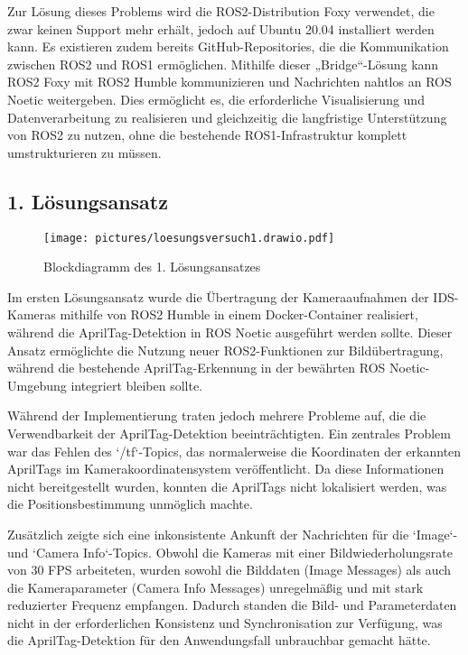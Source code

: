 \documentclass[ngerman]{article}    %
\theoremstyle{definition}
\begin{document}
Zur Lösung dieses Problems wird die ROS2-Distribution Foxy verwendet, die zwar keinen Support mehr erhält, jedoch auf Ubuntu 20.04 installiert werden kann. Es existieren zudem bereits GitHub-Repositories, die die Kommunikation zwischen ROS2 und ROS1 ermöglichen. Mithilfe dieser „Bridge“-Lösung kann ROS2 Foxy mit ROS2 Humble kommunizieren und Nachrichten nahtlos an ROS Noetic weitergeben. Dies ermöglicht es, die erforderliche Visualisierung und Datenverarbeitung zu realisieren und gleichzeitig die langfristige Unterstützung von ROS2 zu nutzen, ohne die bestehende ROS1-Infrastruktur komplett umstrukturieren zu müssen.

\newpage

\subsection{1. Lösungsansatz}

\begin{figure}[htb]
    \centering
    \texttt{[image: pictures/loesungsversuch1.drawio.pdf]}
    \caption{Blockdiagramm des 1. Lösungsansatzes}
    \label{fig:ansatz1}
\end{figure}

Im ersten Lösungsansatz wurde die Übertragung der Kameraaufnahmen der IDS-Kameras mithilfe von ROS2 Humble in einem Docker-Container realisiert, während die AprilTag-Detektion in ROS Noetic ausgeführt werden sollte. Dieser Ansatz ermöglichte die Nutzung neuer ROS2-Funktionen zur Bildübertragung, während die bestehende AprilTag-Erkennung in der bewährten ROS Noetic-Umgebung integriert bleiben sollte.

Während der Implementierung traten jedoch mehrere Probleme auf, die die Verwendbarkeit der AprilTag-Detektion beeinträchtigten. Ein zentrales Problem war das Fehlen des `/tf`-Topics, das normalerweise die Koordinaten der erkannten AprilTags im Kamerakoordinatensystem veröffentlicht. Da diese Informationen nicht bereitgestellt wurden, konnten die AprilTags nicht lokalisiert werden, was die Positionsbestimmung unmöglich machte.

Zusätzlich zeigte sich eine inkonsistente Ankunft der Nachrichten für die `Image`- und `Camera Info`-Topics. Obwohl die Kameras mit einer Bildwiederholungsrate von 30 FPS arbeiteten, wurden sowohl die Bilddaten (Image Messages) als auch die Kameraparameter (Camera Info Messages) unregelmäßig und mit stark reduzierter Frequenz empfangen. Dadurch standen die Bild- und Parameterdaten nicht in der erforderlichen Konsistenz und Synchronisation zur Verfügung, was die AprilTag-Detektion für den Anwendungsfall unbrauchbar gemacht hätte.
\end{document}
